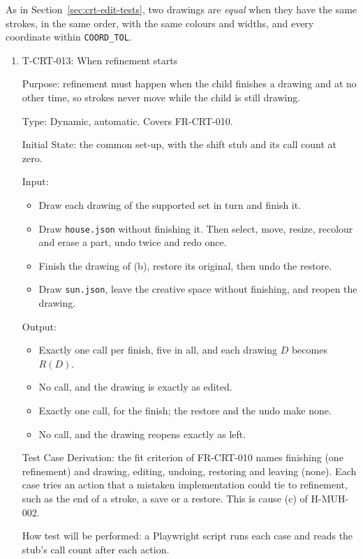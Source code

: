 \documentclass[12pt, titlepage]{article}
\newcommand{\testitem}[1]{\item #1\par\nopagebreak}
\begin{document}
As in Section~\ref{sec:crt-edit-tests}, two drawings are \emph{equal} when
they have the same strokes, in the same order, with the same colours and
widths, and every coordinate within \texttt{COORD\_TOL}.

\begin{enumerate}
\testitem{T-CRT-013: When refinement starts}

Purpose: refinement must happen when the child finishes a drawing and at no
other time, so strokes never move while the child is still drawing.

Type: Dynamic, automatic. Covers FR-CRT-010.

Initial State: the common set-up, with the shift stub and its call count at
zero.

Input:
\begin{itemize}
\item[(a)] Draw each drawing of the supported set in turn and finish it.
\item[(b)] Draw \texttt{house.json} without finishing it. Then select, move,
resize, recolour and erase a part, undo twice and redo once.
\item[(c)] Finish the drawing of (b), restore its original, then undo the
restore.
\item[(d)] Draw \texttt{sun.json}, leave the creative space without
finishing, and reopen the drawing.
\end{itemize}

Output:
\begin{itemize}
\item[(a)] Exactly one call per finish, five in all, and each drawing $D$
becomes $R(D)$.
\item[(b)] No call, and the drawing is exactly as edited.
\item[(c)] Exactly one call, for the finish; the restore and the undo make
none.
\item[(d)] No call, and the drawing reopens exactly as left.
\end{itemize}

Test Case Derivation: the fit criterion of FR-CRT-010 names finishing (one
refinement) and drawing, editing, undoing, restoring and leaving (none).
Each case tries an action that a mistaken implementation could tie to
refinement, such as the end of a stroke, a save or a restore. This is cause
(c) of H-MUH-002.

How test will be performed: a Playwright script runs each case and reads the
stub's call count after each action.


\end{enumerate}
\end{document}
